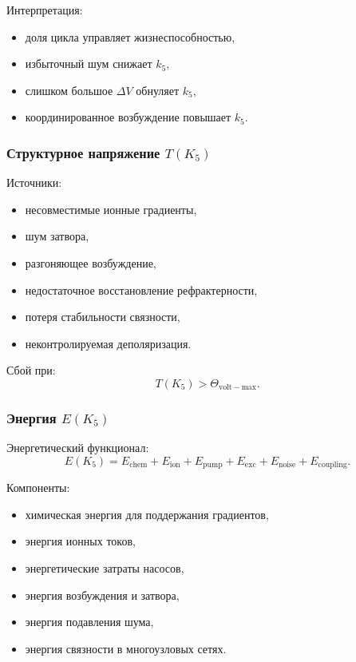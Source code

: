 Интерпретация:
\begin{itemize}
    \item доля цикла управляет жизнеспособностью,
    \item избыточный шум снижает $k_5$,
    \item слишком большое $\Delta V$ обнуляет $k_5$,
    \item координированное возбуждение повышает $k_5$.
\end{itemize}

\subsubsection{Структурное напряжение \texorpdfstring{$T(K_5)$}{T(K_5)}}

Источники:
\begin{itemize}
    \item несовместимые ионные градиенты,
    \item шум затвора,
    \item разгоняющее возбуждение,
    \item недостаточное восстановление рефрактерности,
    \item потеря стабильности связности,
    \item неконтролируемая деполяризация.
\end{itemize}

Сбой при:
\[
T(K_5) > \Theta_{\mathrm{volt-max}}.
\]

\subsubsection{Энергия \texorpdfstring{$E(K_5)$}{E(K_5)}}

Энергетический функционал:
\[
E(K_5)
= E_{\mathrm{chem}}
+ E_{\mathrm{ion}}
+ E_{\mathrm{pump}}
+ E_{\mathrm{exc}}
+ E_{\mathrm{noise}}
+ E_{\mathrm{coupling}}.
\]

Компоненты:
\begin{itemize}
    \item химическая энергия для поддержания градиентов,
    \item энергия ионных токов,
    \item энергетические затраты насосов,
    \item энергия возбуждения и затвора,
    \item энергия подавления шума,
    \item энергия связности в многоузловых сетях.
\end{itemize}

